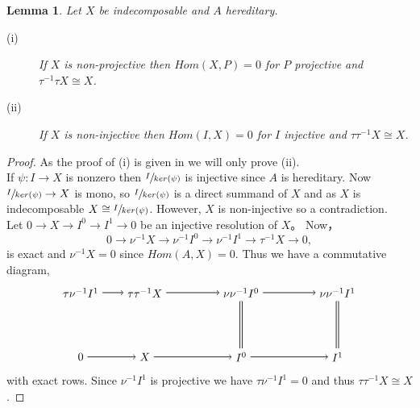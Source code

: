 \documentclass[11.5pt, twoside, a4paper, titlepage]{report}
\theoremstyle{definition}
\theoremstyle{plain}
\newtheorem{lem}[mydef]{Lemma}
\begin{document}
\begin{lem} \label{tauidlem}
Let $X$ be indecomposable and $A$ hereditary.
\begin{description}
\item [(i)] If $X$ is non-projective then $Hom(X,P)=0$ for $P$ projective and $\tau^{-1}\tau X \cong X$.
\item [(ii)] If $X$ is non-injective then $Hom(I,X)=0$ for $I$ injective and $\tau \tau^{-1}X\cong X$.
\end{description}
\end{lem}
\begin{proof}
As the proof of (i) is given in \cite{CB2} we will only prove (ii).\\
If $\psi: I \to X$ is nonzero then $\sfrac{I}{ker(\psi)}$ is injective since $A$ is hereditary. Now $\sfrac{I}{ker(\psi)} \to X$ is mono, so $\sfrac{I}{ker(\psi)}$ is a direct summand of $X$ and as $X$ is indecomposable $X\cong \sfrac{I}{ker(\psi)}$. However, $X$ is non-injective so a contradiction.\\
Let $0 \to X \to I^0 \to I^1 \to 0$ be an injective resolution of $X$。 Now， 
\begin{equation*}
0 \to \nu^{-1}X \to \nu^{-1}I^0 \to \nu^{-1}I^1 \to \tau^{-1}X \to 0,
\end{equation*}
is exact and $\nu^{-1}X=0$ since $Hom(A,X)=0$. Thus we have a commutative diagram, 
\begin{equation*}
\begin{tikzpicture}[->,-latex, auto, main path/.style={->, semithick}, main node/.style={}]
\node	[main node]		(2) at (1,0)		{$\tau\nu^{-1}I^1$};
\node	[main node]		(3) at (3,0)		{$\tau\tau^{-1}X$};
\node [main node]		(4) at (6,0)		{$\nu\nu^{-1}I^0$};
\node [main node]		(5) at (9,0)		{$\nu\nu^{-1}I^1$};

\node	[main node]		(15) at (1,-2)		{$0$};
\node	[main node]		(16) at (3,-2)		{$X$};
\node [main node]		(17) at (6,-2)		{$I^0$};
\node [main node]		(18) at (9,-2)		{$I^1$};

\draw (2) edge [main path] node [auto] {$$} (3);
\draw (3) edge [main path] node [auto] {$$} (4);
\draw (4) edge [main path] node [auto] {$$} (5);

\draw (15) edge [main path] node [auto] {$$} (16);
\path (16) edge [main path] node [auto] {$$} (17);
\draw (17) edge [main path] node [auto] {$$} (18);

\draw (17) edge [-, double, semithick, double distance=1.5pt] (4);
\draw (18) edge [-, double, semithick, double distance=1.5pt] (5);
\end{tikzpicture}
\end{equation*}
with exact rows. Since $\nu^{-1}I^1$ is projective we have $\tau \nu^{-1} I^1=0$ and thus $\tau\tau^{-1}X\cong X$.
\end{proof}
\end{document}
